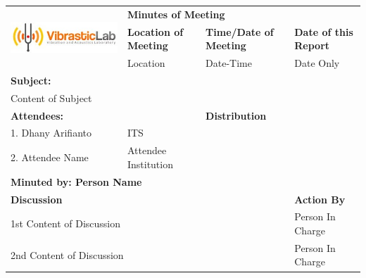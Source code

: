 \documentclass[12pt]{article}
\begin{document}
\begin{table}[!ht]
	\centering
	\begin{tabular}{|l|l|l|l|}
		\hline
		\multirow{3}{*}{\includegraphics[width=0.25\columnwidth]{logoviblab}} & \multicolumn{3}{l|}{\textbf{Minutes of Meeting}} \\
		\cline{2-4}
		& \textbf{Location of Meeting} & \textbf{Time/Date of Meeting} & \textbf{Date of this Report}  \\
		\cline{2-4}
		& Location & Date-Time & Date Only\\
		\hline
		\multicolumn{4}{|l|}{\textbf{Subject:}} \\
		\hline
		\multicolumn{4}{|l|}{Content of Subject} \\
		\hline
		\multicolumn{2}{|l|}{\textbf{Attendees:}} & \multicolumn{2}{l|}{\textbf{Distribution}} \\
		\hline
		1. Dhany Arifianto & ITS & & \\
		\hline
		2. Attendee Name & Attendee Institution & & \\
		\hline
		\multicolumn{4}{|l|}{\textbf{Minuted by: Person Name}} \\
		\hline
		\multicolumn{3}{|l|}{\textbf{Discussion}}& \textbf{Action By} \\
		\hline
		\multicolumn{3}{|l|}{1st Content of Discussion} & Person In Charge \\
		\hline
		\multicolumn{3}{|l|}{2nd Content of Discussion} & Person In Charge \\
		\hline
	\end{tabular}
\end{table}
\end{document}
